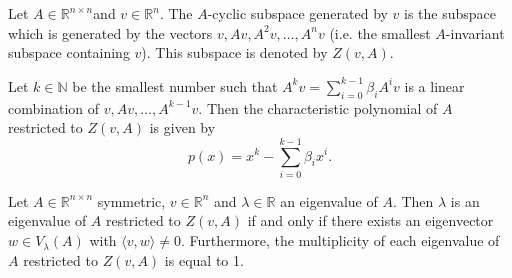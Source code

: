 \documentclass[a4paper,12pt]{article}
\begin{document}
\begin{definition}
Let $A \in \mathbb{R}^{n\times n}$and $v \in \mathbb{R}^n$. The $A$-cyclic subspace generated by $v$ is the subspace which is generated by the vectors $v, Av, A^2v, \ldots, A^nv$ (i.e. the smallest $A$-invariant subspace containing $v$). This subspace is denoted by $Z(v,A)$.
\end{definition}

Let $k\in\mathbb{N}$ be the smallest number such that $A^kv = \sum_{i=0}^{k-1}\beta_i A^i v$ is a linear combination of $v,Av,\ldots,A^{k-1}v$. Then the characteristic polynomial of $A$ restricted to $Z(v,A)$ is given by
$$p(x) = x^k - \sum_{i=0}^{k-1}\beta_ix^i.$$

\begin{claim}
Let $A \in \mathbb{R}^{n\times n}$ symmetric, $v \in \mathbb{R}^n$ and $\lambda \in \mathbb{R}$ an eigenvalue of $A$. Then $\lambda$ is an eigenvalue of $A$ restricted to $Z(v,A)$ if and only if there exists an eigenvector $w \in V_\lambda(A)$ with $\langle v, w \rangle \neq 0$. Furthermore, the multiplicity of each eigenvalue of $A$ restricted to $Z(v, A)$ is equal to 1.
\end{claim}
\end{document}
